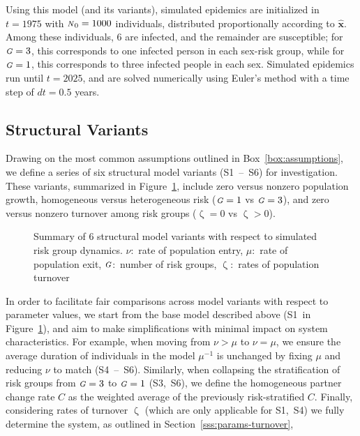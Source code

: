 \documentclass[10pt]{article}
\numberwithin{equation}{section}
\renewcommand{\zeta}{\upzeta}
\newcommand{\N}{{\mbox{\footnotesize{\textit{N}}}}}
\newcommand{\G}{{\mbox{\footnotesize{\textit{G}}}}}
\begin{document}
\par
Using this model (and its variants),
simulated epidemics are initialized in $t = 1975$ with $\N_0 = 1000$ individuals,
distributed proportionally according to $\bm{\hat{x}}$.
Among these individuals, 6 are infected, and the remainder are susceptible;
for $\G = 3$, this corresponds to one infected person in each sex-risk group,
while for $\G = 1$, this corresponds to three infected people in each sex.
Simulated epidemics run until $t = 2025$,
and are solved numerically using Euler's method with a time step of $dt = 0.5$ years.
\subsection{Structural Variants}\label{ss:structure-variants}
Drawing on the most common assumptions outlined in Box~\ref{box:assumptions},
we define a series of six structural model variants (S1~--~S6) for investigation.
These variants, summarized in Figure~\ref{fig:variant-tree}, include
zero versus nonzero population growth,
homogeneous versus heterogeneous risk ($\G = 1$ vs $\G = 3$),
and zero versus nonzero turnover among risk groups ($\zeta = 0$ vs $\zeta > 0$).
\begin{figure}
  \centering
  \caption{Summary of 6 structural model variants with respect to simulated risk group dynamics.
    $\nu$:~rate of population entry,
    $\mu$:~rate of population exit,
    $\G$:~number of risk groups,
    $\zeta$:~rates of population turnover}
  \label{fig:variant-tree}
\end{figure}
\par
In order to facilitate fair comparisons across model variants with respect to parameter values,
we start from the base model described above (S1~in Figure~\ref{fig:variant-tree}),
and aim to make simplifications with minimal impact on system characteristics.
For example, when moving from $\nu > \mu$ to $\nu = \mu$,
we ensure the average duration of individuals in the model $\mu^{-1}$ is unchanged
by fixing $\mu$ and reducing $\nu$ to match (S4~--~S6).
Similarly, when collapsing the stratification of risk groups from $\G = 3$ to $\G = 1$ (S3,~S6),
we define the homogeneous partner change rate $C$
as the weighted average of the previously risk-stratified $C$.
Finally, considering rates of turnover $\zeta$
(which are only applicable for S1,~S4)
we fully determine the system, as outlined in Section~\ref{sss:params-turnover},
\end{document}
